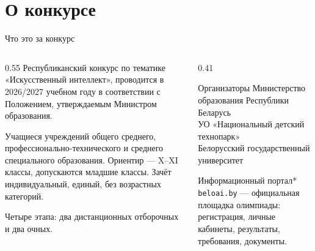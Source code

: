 \section{О конкурсе}

\begin{frame}{Что это за конкурс}
  \begin{columns}[T]
    \begin{column}{0.55\textwidth}
       Республиканский конкурс по тематике
      «Искусственный интеллект», проводится в 2026/2027 учебном году
      в соответствии с Положением, утверждаемым Министром образования.

      \medskip
       Учащиеся учреждений общего среднего,
      профессионально-технического и среднего специального образования.
      Ориентир --- X--XI классы, допускаются младшие классы.
      Зачёт индивидуальный, единый, без возрастных категорий.

      \medskip
       Четыре этапа: два дистанционных отборочных и
      два очных.
    \end{column}
    \begin{column}{0.41\textwidth}
      \begin{block}{Организаторы}
        Министерство образования Республики Беларусь\\[0.35em]
        УО «Национальный детский технопарк»\\[0.35em]
        Белорусский государственный университет
      \end{block}
      \begin{block}{Информационный портал*}
        \texttt{beloai.by} --- официальная площадка олимпиады:
        регистрация, личные кабинеты, результаты, требования,
        документы.
      \end{block}
    \end{column}
  \end{columns}
\end{frame}
